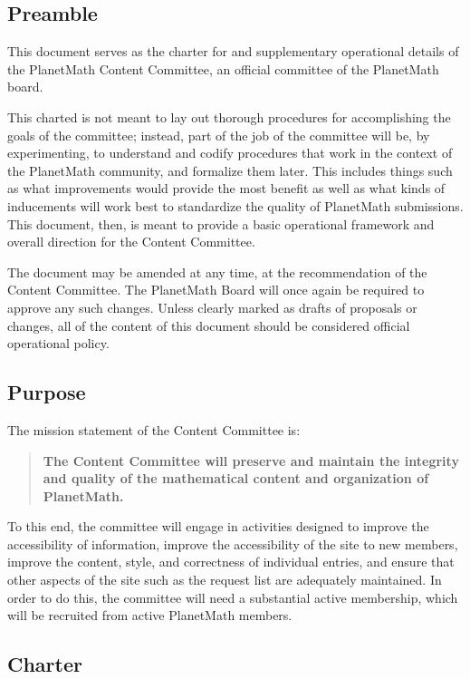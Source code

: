 
\subsection*{Preamble}
This document serves as the charter for and supplementary operational details of the PlanetMath Content Committee, an official committee of the PlanetMath board.

This charted is not meant to lay out thorough procedures for accomplishing the goals of the committee; instead, part of the job of the committee will be, by experimenting, to understand and codify procedures that work in the context of the PlanetMath community, and formalize them later. This includes things such as what improvements would provide the most benefit as well as what kinds of inducements will work best to standardize the quality of PlanetMath submissions. This document, then, is meant to provide a basic operational framework and overall direction for the Content Committee.

The document may be amended at any time, at the recommendation of the Content Committee. The PlanetMath Board will once again be required to approve any such changes. Unless clearly marked as drafts of proposals or changes, all of the content of this document should be considered official operational policy.

\subsection*{Purpose}
The mission statement of the Content Committee is:

\begin{quote}
\textbf{The Content Committee will preserve and maintain the integrity and quality of the mathematical content and organization of PlanetMath.}
\end{quote}

To this end, the committee will engage in activities designed to improve the accessibility of information, improve the accessibility of the site to new members, improve the content, style, and correctness of individual entries, and ensure that other aspects of the site such as the request list are adequately maintained. In order to do this, the committee will need a substantial active membership, which will be recruited from active PlanetMath members.

\subsection*{Charter}

